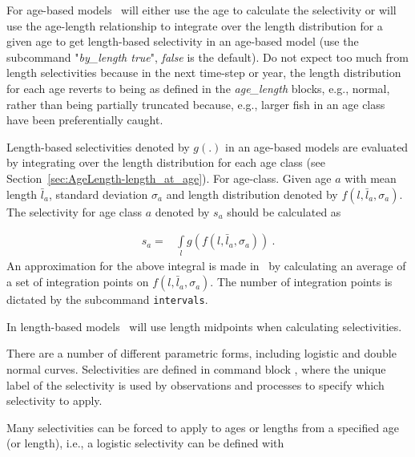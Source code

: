 \ifAgeBased
For age-based models \CNAME\ will either use the age to calculate the selectivity or will use the age-length relationship to integrate over the length distribution for a given age to get length-based selectivity in an age-based model (use the subcommand "\textit{by\_length true}", \textit{false} is the default). Do not expect too much from length selectivities because in the next time-step or year, the length distribution for each age reverts to being as defined in the \textit{age\_length} blocks, e.g., normal, rather than being partially truncated because, e.g., larger fish in an age class have been preferentially caught.

Length-based selectivities denoted by \(g(.)\) in an age-based models are evaluated by integrating over the length distribution for each age class (see Section~\ref{sec:AgeLength-length_at_age}). For age-class. Given age \(a\) with mean length \(\bar{l}_a\), standard deviation \(\sigma_a\) and length distribution denoted by \(f(l,\bar{l}_a, \sigma_a)\). The selectivity for age class \(a\) denoted by \(s_a\) should be calculated as

\begin{align*}
	s_a = & \int\limits_l g(f(l,\bar{l}_a, \sigma_a)) \ .
\end{align*}
%
An approximation for the above integral is made in \CNAME\ by calculating an average of a set of integration points on \(f(l,\bar{l}_a, \sigma_a)\). The number of integration points is dictated by the subcommand \texttt{intervals}.

\else
In length-based models \CNAME\ will use length midpoints when calculating selectivities. 
\fi %

There are a number of different parametric forms, including logistic and double normal curves. Selectivities are defined in command block , where the unique label of the selectivity is used by observations and processes to specify which selectivity to apply.

Many selectivities can be forced to apply to ages or lengths from a specified age (or length), i.e., a logistic selectivity 
 can be defined with

